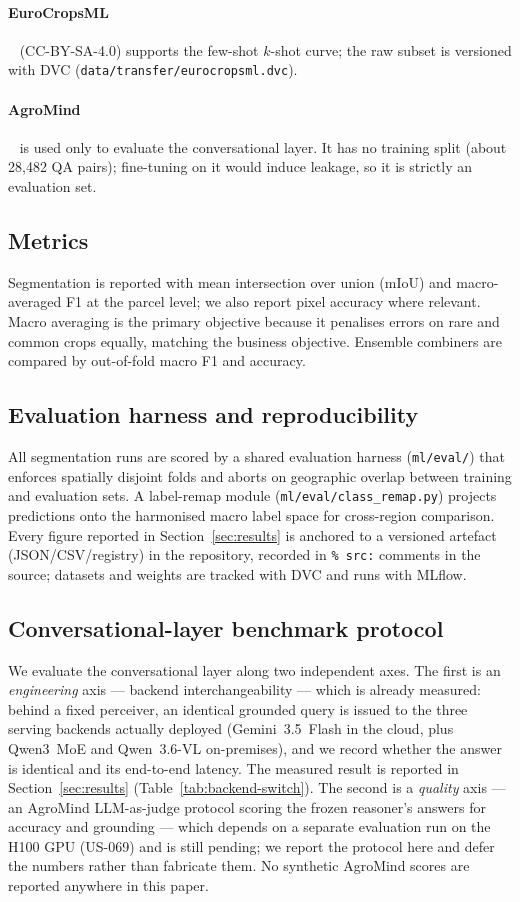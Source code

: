 \paragraph{EuroCropsML}~\cite{reuss2025eurocropsml} (CC-BY-SA-4.0)
supports the few-shot $k$-shot curve; the raw subset is versioned with
DVC (\texttt{data/transfer/eurocropsml.dvc}).

\paragraph{AgroMind}~\cite{ruan2025agromind} is used only to evaluate
the conversational layer. It has no training split (about 28{,}482 QA
pairs); fine-tuning on it would induce leakage, so it is strictly an
evaluation set.

\subsection{Metrics}
Segmentation is reported with mean intersection over union (mIoU) and
macro-averaged F1 at the parcel level; we also report pixel accuracy
where relevant. Macro averaging is the primary objective because it
penalises errors on rare and common crops equally, matching the
business objective. Ensemble combiners are compared by out-of-fold
macro F1 and accuracy.

\subsection{Evaluation harness and reproducibility}
All segmentation runs are scored by a shared evaluation harness
(\texttt{ml/eval/}) that enforces spatially disjoint folds and aborts on
geographic overlap between training and evaluation sets. A label-remap
module (\texttt{ml/eval/class\_remap.py}) projects predictions onto the
harmonised macro label space for cross-region comparison. Every figure
reported in Section~\ref{sec:results} is anchored to a versioned
artefact (JSON/CSV/registry) in the repository, recorded in
\texttt{\% src:} comments in the source; datasets and weights are
tracked with DVC and runs with MLflow.

\subsection{Conversational-layer benchmark protocol}
\label{sec:experiments-llm}
We evaluate the conversational layer along two independent axes. The
first is an \emph{engineering} axis --- backend interchangeability ---
which is already measured: behind a fixed perceiver, an identical
grounded query is issued to the three serving backends actually deployed
(Gemini~3.5~Flash in the cloud, plus Qwen3~MoE and Qwen~3.6-VL
on-premises), and we record whether the answer is identical and its
end-to-end latency. The measured result is reported in
Section~\ref{sec:results} (Table~\ref{tab:backend-switch}). The second
is a \emph{quality} axis --- an AgroMind LLM-as-judge protocol scoring the
frozen reasoner's answers for accuracy and grounding --- which depends on
a separate evaluation run on the H100 GPU (US-069) and is still pending;
we report the protocol here and defer the numbers rather than fabricate
them. No synthetic AgroMind scores are reported anywhere in this paper.
